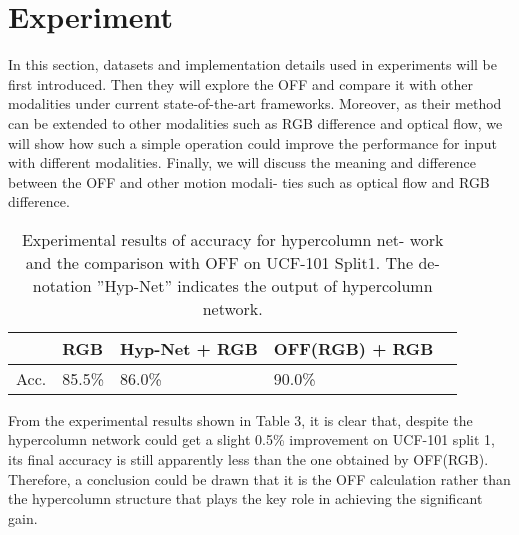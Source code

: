 \documentclass[10pt,twocolumn,letterpaper]{article}
\begin{document}
\section{Experiment}
In this section, datasets and implementation details used in experiments will be first introduced. Then they will explore the OFF and compare it with other modalities under current state-of-the-art frameworks. Moreover, as their method can be extended to other modalities such as RGB difference and optical flow, we will show how such a simple operation could improve the performance for input with different modalities. Finally, we will discuss the meaning and difference between the OFF and other motion modali-
ties such as optical flow and RGB difference.
 \begin{table}[!htbp]
 	\centering
 	\begin{tabular}{|p{1cm}|p{1.5cm}|p{1.5cm}|p{1.5cm}|p{1.5cm}|}
 		\hline
 		 & RGB & Hyp-Net + RGB&  OFF(RGB) + RGB   \\
 		\hline
 		Acc. & 85.5\% &86.0\% &90.0\% \\
 		\hline
 	\end{tabular}
 	\caption{Experimental results of accuracy for hypercolumn net-
 		work and the comparison with OFF on UCF-101 Split1. The de-
 		notation ”Hyp-Net” indicates the output of hypercolumn network.} \label{Table}
 \end{table}
\par From the experimental results shown in Table 3, it is clear that, despite the hypercolumn network could get a slight 0.5\% improvement on UCF-101 split 1, its final accuracy is still apparently less than the one obtained by OFF(RGB). Therefore, a conclusion could be drawn that
it is the OFF calculation rather than the hypercolumn structure that plays the key role in achieving the significant gain.


\end{document}

